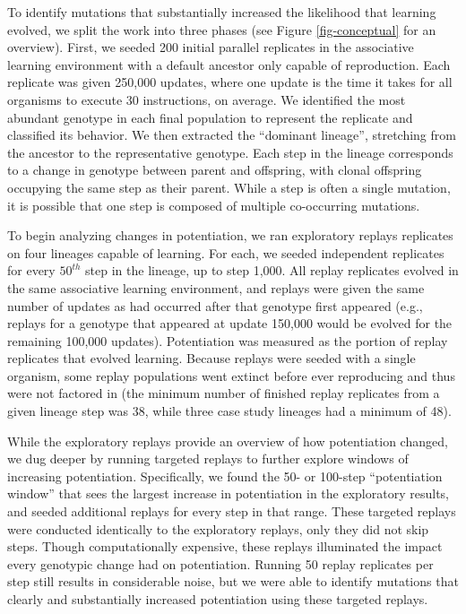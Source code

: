 To identify mutations that substantially increased the likelihood that learning evolved, we split the work into three phases (see Figure \ref{fig-conceptual} for an overview).
%
First, we seeded 200 initial parallel replicates in the associative learning environment with a default ancestor only capable of reproduction. 
Each replicate was given 250,000 updates, where one update is the time it takes for all organisms to execute 30 instructions, on average. 
We identified the most abundant genotype in each final population to represent the replicate and classified its behavior. 
We then extracted the ``dominant lineage'', stretching from the ancestor to the representative genotype. 
Each step in the lineage corresponds to a change in genotype between parent and offspring, with clonal offspring occupying the same step as their parent.
While a step is often a single mutation, it is possible that one step is composed of multiple co-occurring mutations.

To begin analyzing changes in potentiation, we ran exploratory replays replicates on four lineages capable of learning.
For each, we seeded independent replicates for every $50^{th}$ step in the lineage, up to step 1,000.
All replay replicates evolved in the same associative learning environment, and replays were given the same number of updates as had %
occurred after that genotype first appeared (e.g., replays for a genotype that appeared at update 150,000 would be evolved for the remaining 100,000 updates). 
Potentiation was measured as the portion of replay replicates that evolved learning. %
Because replays were seeded with a single organism, some replay populations went extinct before ever reproducing and thus were not factored in (the minimum number of finished replay replicates from a given lineage step was 38, while three case study lineages had a minimum of 48). 

While the exploratory replays provide an overview of how potentiation changed, we dug deeper by running targeted replays to further explore windows of increasing potentiation.
Specifically, we found the 50- or 100-step ``potentiation window'' that sees the largest increase in potentiation in the exploratory results, and seeded additional replays for every step in that range.
These targeted replays were conducted identically to the exploratory replays, only they did not skip steps.
Though computationally expensive, these replays illuminated the impact every genotypic change had on potentiation. 
Running 50 replay replicates per step still results in considerable noise, but we were able to identify mutations that clearly and substantially increased potentiation using these targeted replays.

